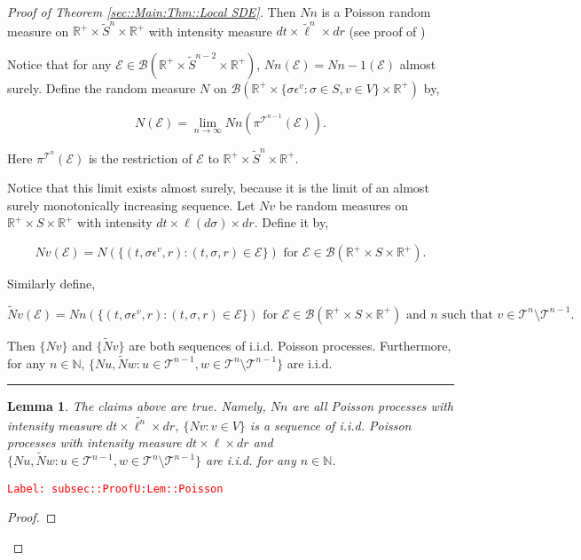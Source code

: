 \documentclass[12pt]{article}
\newcommand{\mb}{\mathbb}
\newcommand{\mc}{\mathcal}
\newcommand{\ms}{\mathscr}
\newcommand{\ra}{\rightarrow}
\newcommand{\te}{\text}
\newcommand{\ep}{\epsilon}
\newcommand{\tr}{\textcolor{red}}
\newcommand{\labe}[1]{\tr{\texttt{Label: #1}}}
\newcommand{\ind}{\hspace{24pt}}
\newcommand{\lin}{\rule{\linewidth}{0.4 pt}}
\renewcommand{\v}{v}							%
\newcommand{\vv}{u}								%
\newcommand{\vvv}{w}							%
\renewcommand{\S}{S}							%
\newcommand{\s}{\sigma}							%
\newcommand{\ev}{\ep}							%
\renewcommand{\t}{t}							%
\newcommand{\proj}{\pi}							%
\newcommand{\vind}[1]{^{#1}}					%
\newcommand{\vsi}[1]{^{#1}}						%
\newcommand{\ts}[1]{_{#1}}						%
\newcommand{\tree}{\mc{T}}						%
\newcommand{\sln}[1]{^{#1}}						%
\newcommand{\poiss}{N}							%
\newcommand{\Sm}{\ell}							%
\renewcommand{\r}{r}							%
\newcommand{\alt}[1]{\widetilde{#1}}			%
\newcommand{\evnt}{\mc{E}}						%
\newtheorem{lem}[thms]{Lemma}
\begin{document}
\begin{proof}[Proof of Theorem \ref{sec::Main:Thm::Local SDE}]
Then \(\poiss{n}\) is a Poisson random measure on \(\mb{R}^+\times\alt{\S}^n\times \mb{R}^+\) with intensity measure \(d\t\times \alt{\Sm}^n\times d\r\) (see proof of \cite[Theorem 14.7.1(b)]{DalVer08})

\ind Notice that for any \(\evnt{} \in \ms{B}(\mb{R}^+\times \alt{\S}^{n-2}\times \mb{R}^+)\), \(\poiss{n}(\evnt{}) = \poiss{n-1}(\evnt{})\) almost surely. Define the random measure \(\poiss{}\) on \(\ms{B}(\mb{R}^+\times \{\s\ev\vind{\v}:\s\in \S,\v \in V\}\times \mb{R}^+)\) by,

\[\poiss{}(\evnt{}) = \lim_{n \ra\infty}\poiss{n}\left(\proj\vsi{\tree\sln{n-1}}\ts{}(\evnt{})\right).\]

Here \(\proj\vsi{\tree\sln{n}}\ts{}(\evnt{})\) is the restriction of \(\evnt{}\) to \(\mb{R}^+\times \alt{\S}^n\times\mb{R}^+\). 

\ind Notice that this limit exists almost surely, because it is the limit of an almost surely monotonically increasing sequence. Let \(\poiss{\v}\) be random measures on \(\mb{R}^+\times\S\times\mb{R}^+\) with intensity \(d\t\times\Sm(d\s)\times d\r\). Define it by,

\[\poiss{\v}(\evnt{}) = \poiss{}\left(\{(\t,\s\ev\vind{\v},\r):(\t,\s,\r)\in \evnt{}\}\right) \te{ for } \evnt{} \in \ms{B}(\mb{R}^+\times\S\times\mb{R}^+).\]

Similarly define,

\[\alt{\poiss}{\v}(\evnt{}) = \poiss{n}\left(\{(\t,\s\ev\vind{\v},\r):(\t,\s,\r)\in \evnt{}\}\right)\te{ for } \evnt{} \in \ms{B}(\mb{R}^+\times\S\times\mb{R}^+)\te{ and }n\te{ such that } \v\in \tree\sln{n}\setminus\tree\sln{n-1}.\]

Then \(\{\poiss{\v}\}\) and \(\{\alt{\poiss}{\v}\}\) are both sequences of i.i.d. Poisson processes. Furthermore, for any \(n \in \mb{N}\), \(\{\poiss{\vv},\alt{\poiss}{\vvv}:\vv\in \tree\sln{n-1},\vvv\in\tree\sln{n}\setminus\tree\sln{n-1}\}\) are i.i.d.

\lin

\begin{lem}
The claims above are true. Namely, \(\poiss{n}\) are all Poisson processes with intensity measure \(d\t\times\alt{\Sm^{n}}\times d\r\), \(\{\poiss{\v}:\v\in V\}\) is a sequence of i.i.d. Poisson processes with intensity measure \(d\t\times\Sm\times d\r\) and \(\{\poiss{\vv},\alt{\poiss}{\vvv}:\vv\in \tree\sln{n-1},\vvv\in\tree\sln{n}\setminus\tree\sln{n-1}\}\) are i.i.d. for any \(n \in \mb{N}\).

\label{subsec::ProofU:Lem::Poisson}
\end{lem}
\labe{subsec::ProofU:Lem::Poisson}
\begin{proof}


\end{proof}
\end{proof}
\end{document}
